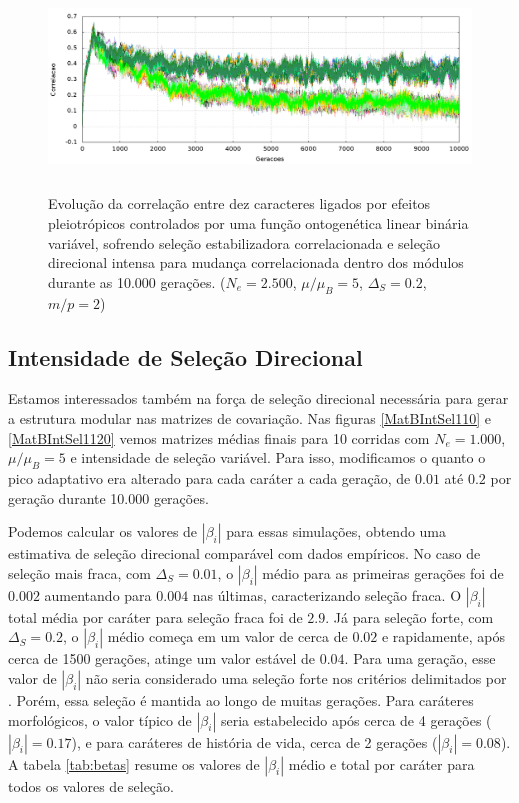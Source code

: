 \begin{figure}[htbp]
    \centering
    \includegraphics[width=150mm, height=55mm]{figuras/direcionalRMu5Ne2500IntSel200.png}
    \caption{Evolução da correlação entre dez caracteres ligados por efeitos
        pleiotrópicos controlados por uma função ontogenética linear binária
        variável, sofrendo seleção estabilizadora correlacionada
        e seleção direcional intensa para mudança correlacionada dentro dos
        módulos durante as 10.000 gerações.
    ($N_e = 2.500$, $\mu/\mu_B=5$, $\Delta_S=0.2$, $m/p=2$)}
    \label{MatBDirecionalNe2500RMu5}
\end{figure}

\subsection{Intensidade de Seleção Direcional}

Estamos interessados também na força de seleção direcional necessária
para gerar a estrutura modular nas matrizes de covariação.
Nas figuras \ref{MatBIntSel110} e \ref{MatBIntSel1120} vemos matrizes
médias finais para 10 corridas com $N_e = 1.000$, $\mu/\mu_B=5$ e
intensidade de seleção variável.
Para isso, modificamos o quanto o pico adaptativo era alterado para cada
caráter a cada geração, de $0.01$ até $0.2$ por geração durante 10.000
gerações.

Podemos calcular os valores de $|\beta_i|$ para essas simulações,
obtendo uma estimativa de seleção direcional comparável com dados
empíricos.
No caso de seleção mais fraca, com $\Delta_S = 0.01$, o $|\beta_i|$
médio para as primeiras gerações foi de $0.002$ aumentando para $0.004$
nas últimas, caracterizando seleção fraca. 
O $|\beta_i|$ total média por caráter para seleção fraca foi de $2.9$.
Já para seleção forte, com $\Delta_S = 0.2$, o $|\beta_i|$ médio começa em um
valor de cerca de $0.02$ e rapidamente, após cerca de 1500 gerações,
atinge um valor estável de $0.04$. 
Para uma geração, esse valor de $|\beta_i|$ não seria considerado uma
seleção forte nos critérios delimitados por \cite{Kingsolver2001}.
Porém, essa seleção é mantida ao longo de muitas gerações.
Para caráteres morfológicos, o valor típico de $|\beta_i|$ seria
estabelecido após cerca de 4 gerações ($|\beta_i|=0.17$), e para caráteres de história de vida,
cerca de 2 gerações ($|\beta_i|=0.08$).
A tabela \ref{tab:betas} resume os valores de $|\beta_i|$ médio e total
por caráter para todos os valores de seleção.

